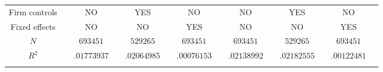 \documentclass[11pt,article]{memoir}
\begin{document}
\begin{landscape}
\begin{table}[htbp]
\begin{tabularx}{\linewidth}{cXcXcXcXcXcXcX}
Firm controls
& & NO 									
& & YES		   				
& & NO		        
& &	NO								
& &	YES								
& & NO
\\	
Fixed effects
& & NO									
& & NO		   				
& & YES		        
& &	NO								
& &	NO								
& & YES
\\	
$N $
& & $693451$									
& & $529265$		   				
& & $693451$				        
& &	$693451$								
& &	$529265$									
& & $693451$
\\	
$R^2$
& & $.01773937$
& & $.02064985$
& & $.00076153$
& & $.02138992$
& & $.02182555$
& & $.00122481$
\\\\		
\hline 
\end{tabularx}
\end{table}
\end{landscape}
\end{document}
